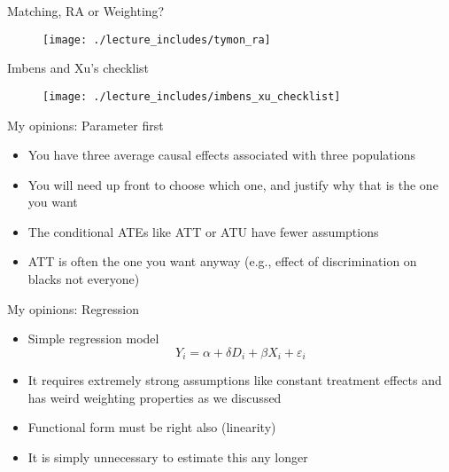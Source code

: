 \documentclass{beamer}
\begin{document}
\begin{frame}{Matching, RA or Weighting?}


  \begin{figure}
    \texttt{[image: ./lecture\_includes/tymon\_ra]}
  \end{figure}


\end{frame}


\begin{frame}{Imbens and Xu's checklist}


  \begin{figure}
    \texttt{[image: ./lecture\_includes/imbens\_xu\_checklist]}
  \end{figure}


\end{frame}




\begin{frame}{My opinions: Parameter first}

\begin{itemize}

\item You have three average causal effects associated with three populations
\item You will need up front to choose which one, and justify why that is the one you want
\item The conditional ATEs like ATT or ATU have fewer assumptions
\item ATT is often the one you want anyway (e.g., effect of discrimination on blacks not everyone)
\end{itemize}

\end{frame}

\begin{frame}{My opinions: Regression}

\begin{itemize}
\item Simple regression model $$Y_i = \alpha + \delta D_i + \beta X_i +\varepsilon_i$$
\item It requires extremely strong assumptions like constant treatment effects and has weird weighting properties as we discussed
\item Functional form must be right also (linearity)
\item It is simply unnecessary to estimate this any longer
\end{itemize}

\end{frame}
\end{document}
